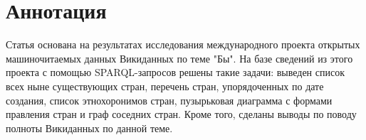 \section{Аннотация}

Статья основана на результатах исследования международного проекта открытых машиночитаемых данных Викиданных по теме "Бы". На базе сведений из этого проекта с помощью SPARQL-запросов решены такие задачи: выведен список всех ныне существующих стран, перечень стран, упорядоченных по дате создания, список этнохоронимов стран, пузырьковая диаграмма с формами правления стран и граф соседних стран. Кроме того, сделаны выводы по поводу полноты Викиданных по данной теме.